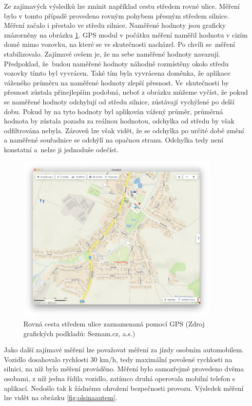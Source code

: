 \documentclass[czech, bachelor]{diploma}
\begin{document}
Ze zajímavých výsledků lze zmínit například cestu středem rovné ulice. Měření bylo v tomto případě provedeno rovným pohybem
přesným středem silnice. Měření začalo i přestalo ve středu silnice. Naměřené hodnoty jsou graficky znázorněny na obrázku
\ref{fig:louky}. GPS modul v počátku měření naměřil hodnotu v cizím domě mimo vozovku, na které se ve skutečnosti nacházel.
Po chvíli se~měření stabilizovalo. Zajímavé ovšem je, že na sebe naměřené hodnoty navazují. Předpoklad, že~budou naměřené hodnoty
náhodně rozmístěny okolo středu vozovky tímto byl vyvrácen. Také tím byla vyvrácena doměnka, že aplikace váženého průměru
na naměřené hodnoty zlepší přesnost. Ve~skutečnosti by přesnost zůstala přinejlepším podobná, neboť z obrázku můžeme vyčíst, že
pokud se naměřené hodnoty odchylují od středu silnice, zůstávají vychýlené po delší dobu. Pokud by na tyto hodnoty byl aplikován
vážený průměr, průměrná hodnota by zůstala pozadu za reálnou hodnotou, odchylka od středu by však odfiltrována nebyla.
Zároveň lze však vidět, že se odchylka po určité době změní a naměřené souřadnice se odchýlí na opačnou stranu. Odchylka tedy není
konstatní a~nelze ji jednoduše odečíst.

\begin{figure}
    \centering
    \includegraphics[width=0.9\textwidth]{Figures/louky.png}
    \caption{Rovná cesta středem ulice zaznamenaná pomocí GPS (Zdroj grafických podkladů: Seznam.cz, a.s.)}
    \label{fig:louky}
\end{figure}

Jako další zajímavé měření lze považovat měření za jízdy osobním automobilem. Vozidlo dosahovalo rychlosti 30 km/h, tedy maximální
povolené rychlosti na silnici, na níž bylo měření prováděno. Měření bylo samozřejmě provedeno dvěma osobami, z níž
jedna řídila vozidlo, zatímco druhá operovala mobilní telefon s aplikací. Nedošlo tak k žádnému ohrožení bezpečnosti provozu.
Výsledek měření lze vidět na obrázku \ref{fig:olsinaautem}.
\end{document}
